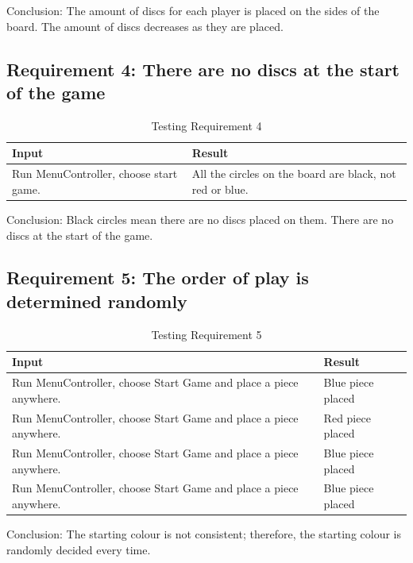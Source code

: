 \documentclass{article}
\begin{document}
{Conclusion: The amount of discs for each player is placed on the sides of the board. The amount of discs decreases as they are placed.

\subsection{Requirement 4: There are no discs at the start of the game}

\begin{table} [h]
	\centering
	\caption{Testing Requirement 4}
    \begin{tabular}{|p{6cm}|p{6cm}|}
        \hline
       	\textbf{Input} & \textbf{Result} \\ \hline
       Run MenuController, choose start game. & All the circles on the board are black, not red or blue. \\
        \hline
    \end{tabular}
\end{table}

Conclusion: Black circles mean there are no discs placed on them. There are no discs at the start of the game.

\newpage
\subsection{Requirement 5: The order of play is determined randomly}

\begin{table} [h]
	\centering
	\caption{Testing Requirement 5}
    \begin{tabular}{|p{6cm}|p{6cm}|}
        \hline
       	\textbf{Input} & \textbf{Result} \\ \hline
       Run MenuController, choose Start Game and place a piece anywhere. & Blue piece placed \\ \hline
       Run MenuController, choose Start Game and place a piece anywhere. & Red piece placed \\ \hline
       Run MenuController, choose Start Game and place a piece anywhere. & Blue piece placed \\ \hline
       Run MenuController, choose Start Game and place a piece anywhere. & Blue piece placed \\
        \hline
    \end{tabular}
\end{table}

Conclusion: The starting colour is not consistent; therefore, the starting colour is randomly decided every time.

}
\end{document}
